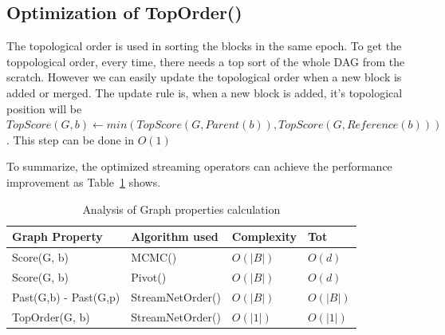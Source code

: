 \subsection{Optimization of TopOrder()}
The topological order is used in sorting the blocks in the same epoch.
To get the toppological order, every time, there needs a top sort of the whole DAG from the scratch.
However we can easily update the topological order when a new block is added or merged.
 The update rule is, when a new block is added, it's topological position will be $TopScore(G, b) \gets min(TopScore(G, Parent(b)), TopScore(G, Reference(b)))$. This step can be done in $O(1)$ 


To summarize, the optimized streaming operators can achieve the performance improvement as Table~\ref{tab:improvement} shows. 

\begin{table}[]
\caption {Analysis of Graph properties calculation} \label{tab:improvement}
\begin{center}
\begin{tabular}{|l|l|l|l|}
\hline
Graph Property        & Algorithm used   & Complexity & Tot \\ \hline
Score(G, b)           & MCMC()           & $O(|B|)$              & $O(d)$  \\ \hline
Score(G, b)           & Pivot()          & $O(|B|)$              & $O(d)$  \\ \hline
Past(G,b) - Past(G,p) & StreamNetOrder() & $O(|B|)$          & $O(|B|)$  \\ \hline
TopOrder(G, b)        & StreamNetOrder() & $O(|1|)$              & $O(|1|)$    \\ \hline
\end{tabular}
\end{center}
\end{table}



